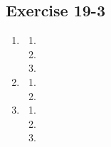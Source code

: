 \subsection{Exercise 19-3}
\begin{multicols}{4}
 \begin{enumerate}[noitemsep, label=\textbf{(\arabic*)} ]
  \item 
\begin{enumerate}[noitemsep, label=\textbf{(\alph*)} ]
 \item 
\item
\item
\end{enumerate}
  \item 
\begin{enumerate}[noitemsep, label=\textbf{(\alph*)} ]
 \item 
\item
\end{enumerate}
\item
\begin{enumerate}[noitemsep, label=\textbf{(\alph*)} ]
 \item 
\item
\item
\end{enumerate}
 \end{enumerate}
\end{multicols}

